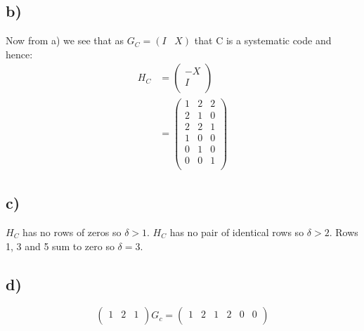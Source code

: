 \documentclass{article}
\begin{document}
\subsection*{b)}
Now from a) we see that as $G_C=(I\;\;\;X)$ that C is a systematic code and hence:
\begin{align*}
H_C&=\begin{pmatrix}
-X\\
I\\
\end{pmatrix}\\
&=\begin{pmatrix}
1&2&2\\
2&1&0\\
2&2&1\\
1&0&0\\
0&1&0\\
0&0&1\\
\end{pmatrix}
\end{align*}
\subsection*{c)}
$H_C$ has no rows of zeros so $\delta>1$. $H_C$ has no pair of identical rows so $\delta>2$. Rows 1, 3 and 5 sum to zero so $\delta=3$.
\subsection*{d)}
$$\begin{pmatrix}1&2&1\\\end{pmatrix}G_c=\begin{pmatrix}1&2&1&2&0&0\\\end{pmatrix}$$
\end{document}

